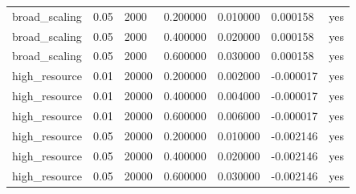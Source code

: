 \begin{tabular}{lllllll}
broad\_scaling & 0.05 & 2000 & 0.200000 & 0.010000 & 0.000158 & yes \\
broad\_scaling & 0.05 & 2000 & 0.400000 & 0.020000 & 0.000158 & yes \\
broad\_scaling & 0.05 & 2000 & 0.600000 & 0.030000 & 0.000158 & yes \\
high\_resource & 0.01 & 20000 & 0.200000 & 0.002000 & -0.000017 & yes \\
high\_resource & 0.01 & 20000 & 0.400000 & 0.004000 & -0.000017 & yes \\
high\_resource & 0.01 & 20000 & 0.600000 & 0.006000 & -0.000017 & yes \\
high\_resource & 0.05 & 20000 & 0.200000 & 0.010000 & -0.002146 & yes \\
high\_resource & 0.05 & 20000 & 0.400000 & 0.020000 & -0.002146 & yes \\
high\_resource & 0.05 & 20000 & 0.600000 & 0.030000 & -0.002146 & yes \\
\bottomrule
\end{tabular}
